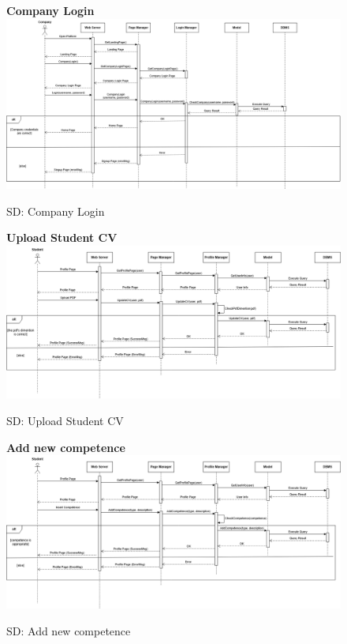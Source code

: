\begin{figure}[H]
\textbf{Company Login}\newline\newline
\includegraphics[width=15cm]{images/architectural design/runtime/DD-UC4.drawio.png}
    \caption{SD: Company Login}
\end{figure}

\begin{figure}[H]
\textbf{Upload Student CV}\newline\newline
\includegraphics[width=15cm]{images/architectural design/runtime/DD-UC5.drawio.png}
    \caption{SD: Upload Student CV}
\end{figure}

\begin{figure}[H]
\textbf{Add new competence}\newline\newline
\includegraphics[width=15cm]{images/architectural design/runtime/DD-UC6.drawio.png}
    \caption{SD: Add new competence}
\end{figure}

